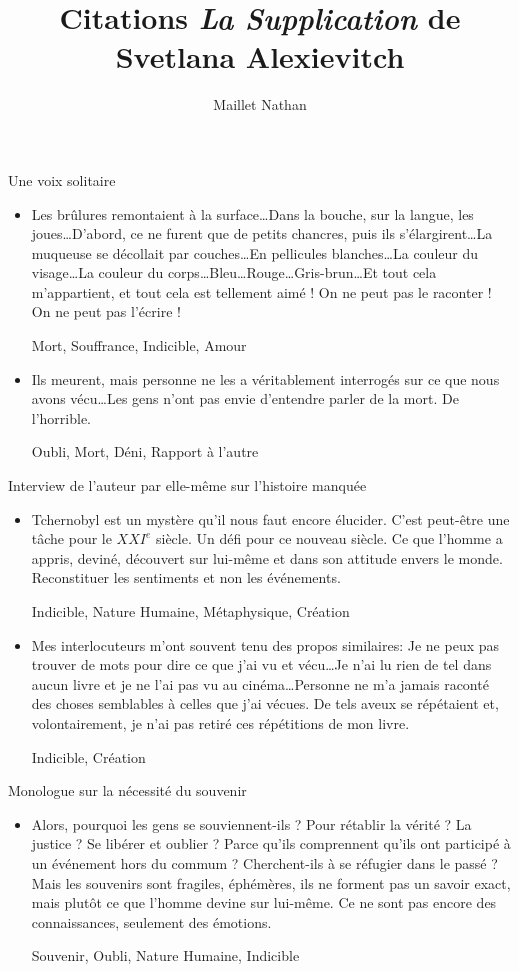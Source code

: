 \documentclass[french,a4paper,11pt,answers]{exam}
\title{Citations \emph{La Supplication} de Svetlana Alexievitch}
\author{Maillet Nathan}
\date{}
\newcommand{\cit}[2]{\og #1 \fg{} \begin{solution}{ #2 }\end{solution}} %
\begin{document}
	\maketitle

	\begin{cadre}{Une voix solitaire}
		\begin{itemize}
			\item \cit {Les brûlures remontaient à la surface\ldots Dans la bouche, sur la langue, les joues\ldots D'abord, ce ne furent que de petits chancres, puis ils s'élargirent\ldots La muqueuse se décollait par couches\ldots En pellicules blanches\ldots La couleur du visage\ldots La couleur du corps\ldots Bleu\ldots Rouge\ldots Gris-brun\ldots Et tout cela m'appartient, et tout cela est tellement aimé ! On ne peut pas le raconter ! On ne peut pas l'écrire !} %
				{Mort, Souffrance, Indicible, Amour} %
			\item \cit {Ils meurent, mais personne ne les a véritablement interrogés sur ce que nous avons vécu\ldots Les gens n'ont pas envie d'entendre parler de la mort. De l'horrible.}
				{Oubli, Mort, Déni, Rapport à l'autre}
		\end{itemize}
	\end{cadre}
	
	\begin{cadre}{Interview de l'auteur par elle-même sur l'histoire manquée}
		\begin{itemize}
			\item \cit {Tchernobyl est un mystère qu'il nous faut encore élucider. C'est peut-être une tâche pour le $XXI^e$ siècle. Un défi pour ce nouveau siècle. Ce que l'homme a appris, deviné, découvert sur lui-même et dans son attitude envers le monde. Reconstituer les sentiments et non les événements.}
				{Indicible, Nature Humaine, Métaphysique, Création}
			\item \cit{Mes interlocuteurs m'ont souvent tenu des propos similaires: \og Je ne peux pas trouver de mots pour dire ce que j'ai vu et vécu\ldots Je n'ai lu rien de tel dans aucun livre et je ne l'ai pas vu au cinéma\ldots Personne ne m'a jamais raconté des choses semblables à celles que j'ai vécues. \fg{} De tels aveux se répétaient et, volontairement, je n'ai pas retiré ces répétitions de mon livre.}
				{Indicible, Création}
		\end{itemize}
	\end{cadre}
	
	\begin{cadre}{Monologue sur la nécessité du souvenir}
		\begin{itemize}
			\item \cit {Alors, pourquoi les gens se souviennent-ils ? Pour rétablir la vérité ? La justice ? Se libérer et oublier ? Parce qu'ils comprennent qu'ils ont participé à un événement hors du commum ? Cherchent-ils à se réfugier dans le passé ? Mais les souvenirs sont fragiles, éphémères, ils ne forment pas un savoir exact, mais plutôt ce que l'homme devine sur lui-même. Ce ne sont pas encore des connaissances, seulement des émotions.}
				{Souvenir, Oubli, Nature Humaine, Indicible}
		\end{itemize}
	\end{cadre}
	
\end{document}
